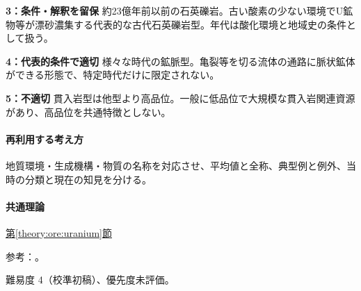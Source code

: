 \noindent\textbf{3：条件・解釈を留保} 約23億年前以前の石英礫岩。古い酸素の少ない環境でU鉱物等が漂砂濃集する代表的な古代石英礫岩型。年代は酸化環境と地域史の条件として扱う。\par

\noindent\textbf{4：代表的条件で適切} 様々な時代の鉱脈型。亀裂等を切る流体の通路に脈状鉱体ができる形態で、特定時代だけに限定されない。\par

\noindent\textbf{5：不適切} 貫入岩型は他型より高品位。一般に低品位で大規模な貫入岩関連資源があり、高品位を共通特徴としない。\par

\paragraph{再利用する考え方} 地質環境・生成機構・物質の名称を対応させ、平均値と全称、典型例と例外、当時の分類と現在の知見を分ける。

\paragraph{共通理論} \hyperref[theory:ore:uranium]{第\ref*{theory:ore:uranium}節}

\par 参考：\cite{ore50_uranium_ref,ore50_intrusive_ref}。

\par 難易度 4（校準初稿）、優先度未評価。
